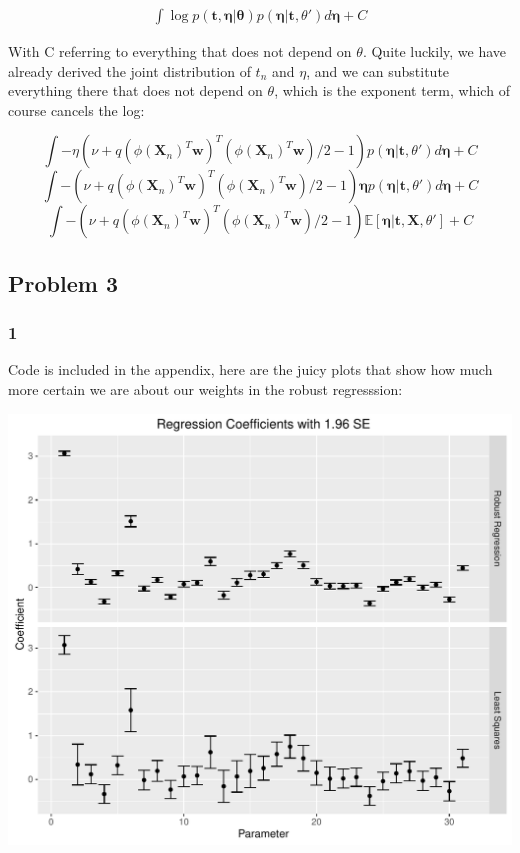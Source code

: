 \documentclass[a4paper,12pt]{article}\usepackage[]{graphicx}\usepackage[]{color}
\makeatletter
\def\maxwidth{ %
  \ifdim\Gin@nat@width>\linewidth
    \linewidth
  \else
    \Gin@nat@width
  \fi
}
\newenvironment{knitrout}{}{} %
\makeatother
\begin{document}
\begin{align*}
\int \log p(\bm{t}, \bm{\eta | \theta}) p(\bm{\eta} | \bm{t}, \theta')d\bm{\eta} + C
\end{align*}

With C referring to everything that does not depend on $\theta$. Quite luckily, we have already derived the joint distribution of $t_n$ and $\eta$, and we can substitute everything there that does not depend on $\theta$, which is the exponent term, which of course cancels the log:


$$
\int -\eta(\nu + q (\phi(\bm{X}_n)^{T}\bm{w})^T(\phi(\bm{X}_n)^T\bm{w})/2 - 1) p(\bm{\eta} | \bm{t}, \theta')d\bm{\eta} + C
$$
$$
\int -(\nu + q (\phi(\bm{X}_n)^{T}\bm{w})^T(\phi(\bm{X}_n)^T\bm{w})/2 - 1) \bm{\eta} p(\bm{\eta} | \bm{t}, \theta')d\bm{\eta} + C
$$
$$
\int -(\nu + q (\phi(\bm{X}_n)^{T}\bm{w})^T(\phi(\bm{X}_n)^T\bm{w})/2 - 1) \mathbb{E}[\bm{\eta} | \bm{t}, \bm{X}, \theta'] + C
$$
%

\subsection*{Problem 3}

\subsubsection*{1}

Code is included in the appendix, here are the juicy plots that show how much more certain we are about our weights in the robust regresssion:


\begin{knitrout}
\color{fgcolor}
\includegraphics[width=\maxwidth]{figure/coefficients-1} 

\end{knitrout}
\end{document}
